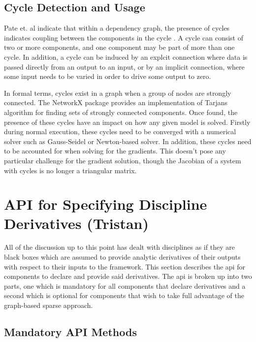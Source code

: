 \documentclass[]{aiaa-tc} %
\begin{document}
    \subsection{Cycle Detection and Usage}
        Pate et. al indicate that within a dependency graph, the presence of cycles indicates coupling between
        the components in the cycle \cite{graph_problem2013}. A cycle can consist of two or more components, and
        one component may be part of more than one cycle. In addition, a cycle can be induced by an explcit connection 
        where data is passed directly from an output to an input, or by an implicit connection, where some input needs to
        be varied in order to drive some output to zero.

        In formal terms, cycles exist in a graph when a group of nodes are strongly connected. The NetworkX package
        provides an implementation of Tarjans algorithm for finding sets of strongly connected
        components\cite{tarjan1972depth,nuutila1994finding}. Once found, the presence of these cycles
        have an impact on how any given model is solved. Firstly during normal execution, these cycles
        need to be converged with a numerical solver such as Gauss-Seidel or Newton-based solver.
        In addition, these cycles need to be accounted for when solving for the gradients. This doesn't
        pose any particular challenge for the gradient solution, though the Jacobian of a system with cycles is no longer
        a triangular matrix.


    \section{API for Specifying Discipline Derivatives (Tristan)}

        All of the discussion up to this point has dealt with disciplines as if they are black boxes
        which are assumed to provide analytic derivatives of their outputs with respect to their inputs
        to the framework. This section describes the api for components to declare and provide
        said derivatives. The api is broken up into two parts, one which is mandatory for all components
        that declare derivatives and a second which is optional for components that wish to take full
        advantage of the graph-based sparse approach.

        \subsection{Mandatory API Methods}
\end{document}
